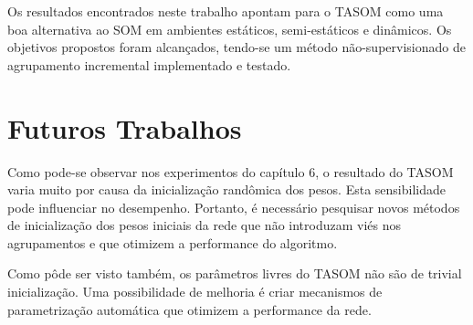 Os resultados encontrados neste trabalho apontam para o TASOM como uma boa alternativa ao SOM em ambientes estáticos, semi-estáticos e dinâmicos. Os objetivos propostos foram alcançados, tendo-se um método não-supervisionado de agrupamento incremental implementado e testado.

\section{Futuros Trabalhos}
Como pode-se observar nos experimentos do capítulo 6, o resultado do TASOM varia muito por causa da inicialização randômica dos pesos. Esta sensibilidade pode influenciar no desempenho. Portanto, é necessário pesquisar novos métodos de inicialização dos pesos iniciais da rede que não introduzam viés nos agrupamentos e que otimizem a performance do algoritmo.

Como pôde ser visto também, os parâmetros livres do TASOM não são de trivial inicialização. Uma possibilidade de melhoria é criar mecanismos de parametrização automática que otimizem a performance da rede.    

   